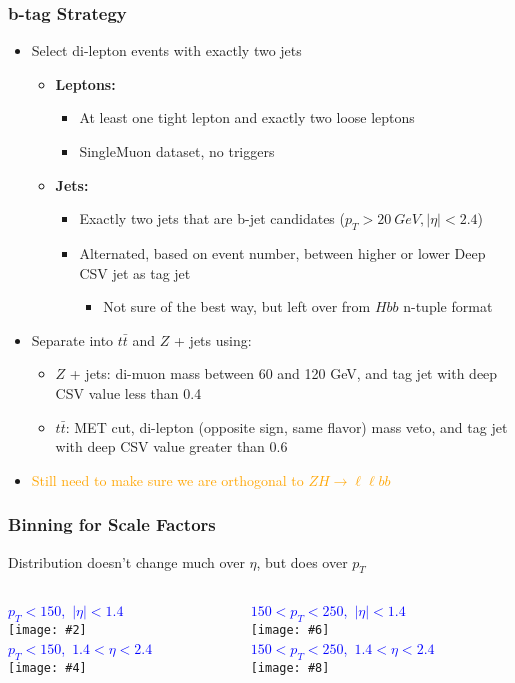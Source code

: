 \documentclass{beamer}
\newcommand{\fourfigs}[8]{
  \begin{columns}
    \begin{column}{0.3\linewidth}
      \centering
      \textcolor{blue}{#1} \\
      \texttt{[image: \#2]} \\
      \textcolor{blue}{#3} \\
      \texttt{[image: \#4]}
    \end{column}
    \begin{column}{0.3\linewidth}
      \centering
      \textcolor{blue}{#5} \\
      \texttt{[image: \#6]} \\
      \textcolor{blue}{#7} \\
      \texttt{[image: \#8]}
    \end{column}
  \end{columns}
}
\newcommand{\ttbar}{\ensuremath{t\bar{t}}}
\begin{document}
\begin{frame}
  \frametitle{b-tag Strategy}

  \begin{itemize}
  \item Select di-lepton events with exactly two jets
    \begin{itemize}
    \item {\bf Leptons:}
      \begin{itemize}
      \item At least one tight lepton and exactly two loose leptons
      \item SingleMuon dataset, no triggers
      \end{itemize}
    \item {\bf Jets:}
      \begin{itemize}
      \item Exactly two jets that are b-jet candidates ($p_T > \SI{20}{GeV}, |\eta| < 2.4$)
      \item Alternated, based on event number,
        between higher or lower Deep CSV jet as tag jet
        \begin{itemize}
        \item Not sure of the best way, but left over from $Hbb$ n-tuple format
        \end{itemize}
      \end{itemize}
    \end{itemize}
  \item Separate into $\ttbar$ and $Z$ + jets using:
    \begin{itemize}
    \item {$Z$ + jets:} di-muon mass between 60 and 120 GeV, and
      tag jet with deep CSV value less than 0.4
    \item {$\ttbar$:} MET cut, di-lepton (opposite sign, same flavor) mass veto, and
      tag jet with deep CSV value greater than 0.6
    \end{itemize}
  \item \textcolor{orange}{Still need to make sure we are orthogonal to
    $ZH \rightarrow \ell\ell bb$}
  \end{itemize}

\end{frame}

\begin{frame}
  \frametitle{Binning for Scale Factors}

  Distribution doesn't change much over $\eta$, but does over $p_T$

  \fourfigs{\mbox{$p_T < 150$, $|\eta| < 1.4$}}
           {190214_tnp_bjets/light_pt_0_150_eta_0_1p4_probe_deepCSVb.pdf}
           {\mbox{$p_T < 150$, $1.4 < \eta < 2.4$}}
           {190214_tnp_bjets/light_pt_0_150_eta_1p4_2p5_probe_deepCSVb.pdf}
           {\mbox{$150 < p_T < 250$, $|\eta| < 1.4$}}
           {190214_tnp_bjets/light_pt_150_250_eta_0_1p4_probe_deepCSVb.pdf}
           {\mbox{$150 < p_T < 250$, $1.4 < \eta < 2.4$}}
           {190214_tnp_bjets/light_pt_150_250_eta_1p4_2p5_probe_deepCSVb.pdf}
           
\end{frame}
\end{document}
